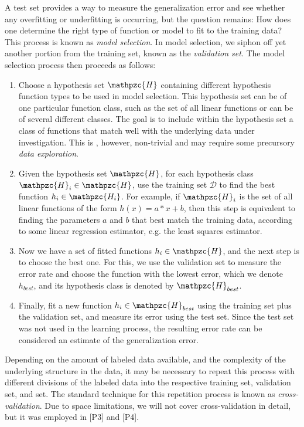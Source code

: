 A test set provides a way to measure the generalization error and see whether any overfitting or underfitting is occurring, but the question remains: How does one determine the right type of function or model to fit to the training data? This process is known as \emph{model selection}. In model selection, we siphon off yet another portion from the training set, known as the \emph{validation set}. The model selection process then proceeds as follows:
%
\begin{enumerate}
\item Choose a hypothesis set $\mathpzc{H}$ containing different hypothesis function types to be used in model selection. This hypothesis set can be of one particular function class, such as the set of all linear functions or can be of several different classes. The goal is to include within the hypothesis set a class of functions that match well with the underlying data under investigation. This is , however, non-trivial and may require some precursory \emph{data exploration}.
%
\item Given the hypothesis set $\mathpzc{H}$, for each hypothesis class $\mathpzc{H}_i \in \mathpzc{H}$, use the training set $\mathcal{D}$ to find the best function $h_i \in \mathpzc{H_i}$.  For example, if $\mathpzc{H}_i$ is the set of all linear functions of the form $h(x) = a * x + b$, then this step is equivalent to finding the parameters $a$ and $b$ that best match the training data, according to some linear regression estimator, e.g. the least squares estimator.
%
\item Now we have a set of fitted functions ${h_i} \in \mathpzc{H}$, and the next step is to choose the best one. For this, we use the validation set to measure the error rate and choose the function with the lowest error, which we denote $h_{best}$, and its hypothesis class is denoted by $\mathpzc{H}_{best}$.

\item Finally, fit a new function $h_i \in \mathpzc{H}_{best}$ using the training set plus the validation set, and measure its  error using the test set. Since the test set was not used in the learning process, the resulting error rate can be considered an estimate of the generalization error.
\end{enumerate}
%
Depending on the amount of labeled data available, and the complexity of the underlying structure in the data, it may be necessary to repeat this process with different divisions of the labeled data into the respective training set, validation set, and  set. The standard technique for this repetition process is known as \emph{cross-validation}. Due to space limitations, we will not cover cross-validation in detail, but it was employed in [P3] and [P4].%
%
